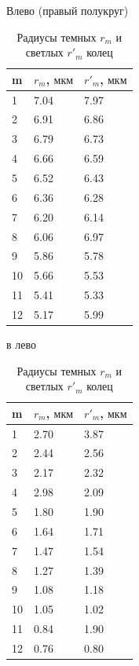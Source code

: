 \documentclass[a4paper]{article}
\begin{document}
Влево (правый полукруг)
\begin{table}[h]
    \centering
    \begin{tabular}{|l|l|l|} %
        \hline
        \textbf{m} & \textbf{$r_m$, $\text{мкм}$} &\textbf{$r'_m$, $\text{мкм}$} \\
        \hline
        1 & 7.04 & 7.97 \\
        \hline
        2 & 6.91 & 6.86\\
        \hline
        3 & 6.79  & 6.73\\
        \hline
        4 & 6.66 &6.59 \\
        \hline
        5 &6.52 &6.43\\
        \hline
        6 &6.36 &6.28\\
        \hline
        7 & 6.20 &6.14\\
        \hline
        8 & 6.06 &6.97\\
        \hline
        9 & 5.86 &5.78\\
        \hline
         10& 5.66 &5.53\\
         \hline
          11& 5.41 &5.33\\
          \hline
         12& 5.17 &5.99\\
        \hline
    \end{tabular}
    \caption{Радиусы темных $r_m$ и светлых $r'_m$ колец }
\end{table}


в лево
\begin{table}[h]
    \centering
    \begin{tabular}{|l|l|l|} %
        \hline
        \textbf{m} & \textbf{$r_m$, $\text{мкм}$} &\textbf{$r'_m$, $\text{мкм}$} \\
        \hline
        1 & 2.70 & 3.87 \\
        \hline
        2 & 2.44 & 2.56\\
        \hline
        3 & 2.17  & 2.32\\
        \hline
        4 & 2.98 &2.09 \\
        \hline
        5 &1.80 &1.90\\
        \hline
        6 &1.64 &1.71\\
        \hline
        7 & 1.47 &1.54\\
        \hline
        8 & 1.27 &1.39\\
        \hline
        9 & 1.08 &1.18\\
        \hline
         10& 1.05 &1.02\\
         \hline
          11& 0.84&1.90\\
          \hline
         12& 0.76 &0.80\\
        \hline
    \end{tabular}
    \caption{Радиусы темных $r_m$ и светлых $r'_m$ колец }
\end{table}
\end{document}
